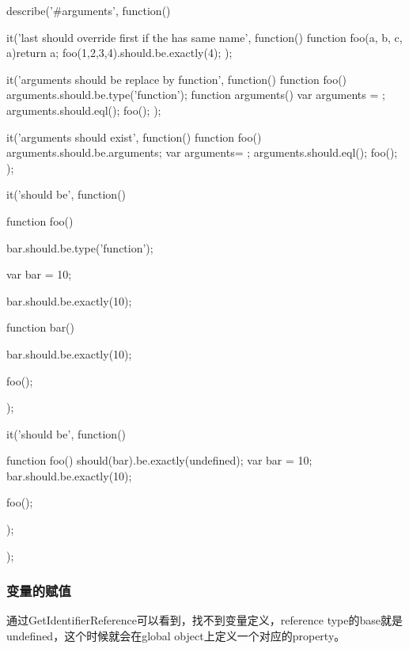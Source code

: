 \begin{JavaScript}
	describe('#arguments', function(){
		it('last should override first if the has same name', function(){
			function foo(a, b, c, a){return a;}
			foo(1,2,3,4).should.be.exactly(4);
		});

		it('arguments should be replace by function', function(){
			function foo(){
				arguments.should.be.type('function');
				function arguments(){}
				var arguments = {};
				arguments.should.eql({});
			}
			foo();
		});

		it('arguments should exist', function(){
			function foo(){
				arguments.should.be.arguments;
				var arguments= {};
				arguments.should.eql({});
			}
			foo();
		});

		it('should be', function(){
			function foo(){

				bar.should.be.type('function');

				var bar = 10;

				bar.should.be.exactly(10);

				function bar(){}

				bar.should.be.exactly(10);

			}

			foo();
		});

		it('should be', function(){
			function foo() {
				should(bar).be.exactly(undefined);
				var bar = 10;
				bar.should.be.exactly(10);
			}

			foo();
		});
	});
\end{JavaScript}
\subsubsection{变量的赋值}
通过GetIdentifierReference可以看到，找不到变量定义，reference type的base就是undefined，这个时候就会在global object上定义一个对应的property。
